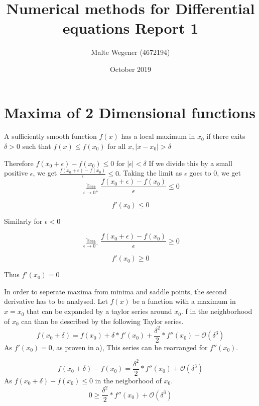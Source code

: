 \documentclass{article}
\title{Numerical methods for Differential equations Report 1}
\author{Malte Wegener (4672194)}
\date{October 2019}
\begin{document}
\maketitle
    
\section{Maxima of  2 Dimensional functions}

A sufficiently smooth function $f(x)$ has a local maximum in $x_{0}$ if there exits $\delta > 0$ such that $f(x) \leq f(x_{0})$ for all $x, \mid x - x_{0} \mid > \delta$ \par
Therefore $f(x_{0}+\epsilon)-f(x_{0}) \leq 0$ for $\mid \epsilon \mid < \delta$
If we divide this by a small positive $\epsilon$, we get $\frac{f(x_{0}+\epsilon)-f(x_{0})}{\epsilon}\leq 0$.
Taking the limit as $\epsilon$ goes to 0, we get
\begin{equation}
   \lim_{\epsilon\to 0^{+}} \frac{f(x_{0}+\epsilon)-f(x_{0})}{\epsilon}\leq 0
\end{equation}

\begin{equation}
   f'(x_{0})\leq 0
\end{equation}

Similarly for $\epsilon < 0$

\begin{equation}
   \lim_{\epsilon\to 0^{-}} \frac{f(x_{0}+\epsilon)-f(x_{0})}{\epsilon}\geq 0
  \end{equation}
   
\begin{equation}
   f'(x_{0})\geq 0
\end{equation}

Thus $f'(x_{0}) = 0$

In order to seperate maxima from minima and saddle points, the second derivative has to be analysed.
Let $f(x)$ be a function with a maximum in $x=x_{0}$ that can be expanded by a taylor series around $x_{0}$. f in the neighborhood of $x_{0}$ can than be described by the following Taylor series.
\begin{equation}
    f(x_{0}+\delta) = f(x_{0})+\delta*f'(x_{0})+\frac{\delta^2}{2}*f''(x_{0}) + \mathcal{O}(\delta^3)
\end{equation}
As $f'(x_{0}) = 0$, as proven in a), This series can be rearranged for $f''(x_{0})$.

\begin{equation}
    f(x_{0}+\delta) - f(x_{0}) = \frac{\delta^2}{2}*f''(x_{0}) + \mathcal{O}(\delta^3)
\end{equation}
 As $f(x_{0}+\delta) - f(x_{0}) \leq 0$ in the neigborhood of $x_{0}$.
\begin{equation}
    0 \geq \frac{\delta^2}{2}*f''(x_{0}) + \mathcal{O}(\delta^3)
\end{equation}
\end{document}
